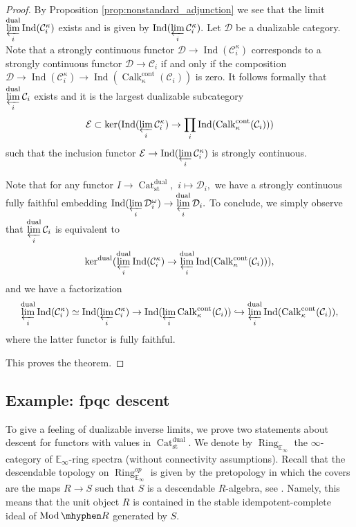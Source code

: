 \documentclass[11pt,leqno]{amsart}
\numberwithin{equation}{section}
\newcommand{\hy}{\mhyphen}
\newcommand{\prolim}[1][]{\mathop{\varprojlim}\limits_{#1}}
\newcommand{\prodd}[1][]{\mathop{\prod}\limits_{#1}}
\newcommand{\limproj}{\varprojlim}
\newcommand{\hto}{\hookrightarrow}
\newcommand{\Cat}{\operatorname{Cat}}
\newcommand{\Ring}{\operatorname{Ring}}
\newcommand{\cont}{\operatorname{cont}}
\newcommand{\st}{\operatorname{st}}
\newcommand{\dual}{\operatorname{dual}}
\newcommand{\bE}{{\mathbb E}}
\newcommand{\cD}{{\mathcal D}}
\newcommand{\cC}{{\mathcal C}}
\newcommand{\cE}{{\mathcal E}}
\newcommand{\Fun}{\operatorname{Fun}}
\newcommand{\Ind}{\operatorname{Ind}}
\newcommand{\Calk}{\operatorname{Calk}}
\newcommand{\Mod}{\operatorname{Mod}}
\begin{document}
\begin{proof}By Proposition \ref{prop:nonstandard_adjunction} we see that the limit $\prolim[i]^{\dual}\Ind(\cC_i^{\kappa})$ exists and is given by $\Ind(\prolim[i]\cC_i^{\kappa}).$ 
Let $\cD$ be a dualizable category. Note that a strongly continuous functor $\cD\to \Ind(\cC_i^{\kappa})$ corresponds to a strongly continuous functor $\cD\to\cC_i$ if and only if the composition $\cD\to \Ind(\cC_i^{\kappa})\to \Ind(\Calk_{\kappa}^{\cont}(\cC_i))$ is zero. It follows formally that $\prolim[i]^{\dual}\cC_i$ exists and it is the largest dualizable subcategory $$\cE\subset\ker(\Ind(\prolim[i]\cC_i^{\kappa})\to\prodd[i] \Ind(\Calk_{\kappa}^{\cont}(\cC_i)))$$ such that the inclusion functor $\cE\to \Ind(\prolim[i]\cC_i^{\kappa})$ is strongly continuous.

Note that for any functor $I\to\Cat_{\st}^{\dual},$ $i\mapsto\cD_i,$ we have a strongly continuous fully faithful embedding $\Ind(\prolim[i] \cD_i^{\omega})\to \prolim[i]^{\dual}\cD_i.$ To conclude, we simply observe that $\prolim[i]^{\dual}\cC_i$ is equivalent to $$\ker^{\dual}(\prolim[i]^{\dual}\Ind(\cC_i^{\kappa})\to \prolim[i]^{\dual}\Ind(\Calk_{\kappa}^{\cont}(\cC_i))),$$ and we have a factorization
$$\prolim[i]^{\dual}\Ind(\cC_i^{\kappa})\simeq \Ind(\prolim[i]\cC_i^{\kappa})\to \Ind(\prolim[i] \Calk_{\kappa}^{\cont}(\cC_i))\hto \prolim[i]^{\dual}\Ind(\Calk_{\kappa}^{\cont}(\cC_i)),$$
where the latter functor is fully faithful.

This proves the theorem.
\end{proof}

\subsection{Example: fpqc descent}
\label{ssec:fpqc_descent}

To give a feeling of dualizable inverse limits, we prove two statements about descent for functors with values in $\Cat_{\st}^{\dual}.$ We denote by $\Ring_{\bE_{\infty}}$ the $\infty$-category of $\bE_{\infty}$-ring spectra (without connectivity assumptions). Recall that the descendable topology on $\Ring_{\bE_{\infty}}^{op}$ is given by the pretopology in which the covers are the maps $R\to S$ such that $S$ is a descendable $R$-algebra, see \cite[Definition 3.18]{Mat}. Namely, this means that the unit object $R$ is contained in the stable idempotent-complete ideal of $\Mod\hy R$ generated by $S.$ 
\end{document}
